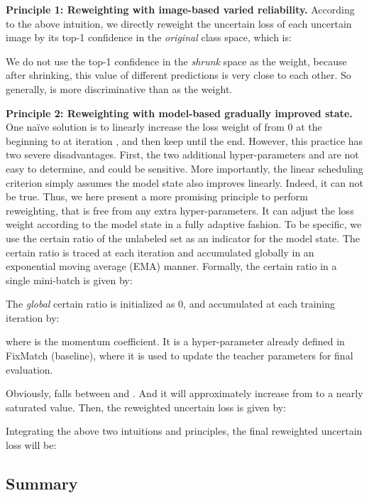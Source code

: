 \documentclass[10pt,twocolumn,letterpaper]{article}
\begin{document}
\vspace{1mm}
\noindent
\textbf{Principle 1: Reweighting with image-based varied reliability.} According to the above intuition, we directly reweight the uncertain loss of each uncertain image by its top-1 confidence  in the \emph{original} class space, which is:
\vspace{-1mm}


We do not use the top-1 confidence  in the \emph{shrunk} space as the weight, because after shrinking, this value of different predictions is very close to each other. So generally,  is more discriminative than  as the weight.

\vspace{1mm}
\noindent
\textbf{Principle 2: Reweighting with model-based gradually improved state.} One na\"ive solution is to linearly increase the loss weight of  from 0 at the beginning to  at iteration , and then keep  until the end. However, this practice has two severe disadvantages. First, the two additional hyper-parameters  and  are not easy to determine, and could be sensitive. More importantly, the linear scheduling criterion simply assumes the model state also improves linearly. Indeed, it can not be true. Thus, we here present a more promising principle to perform reweighting, that is free from any extra hyper-parameters. It can adjust the loss weight according to the model state in a fully adaptive fashion. To be specific, we use the certain ratio of the unlabeled set as an indicator for the model state. The certain ratio is traced at each iteration and accumulated globally in an exponential moving average (EMA) manner. Formally, the certain ratio in a single mini-batch is given by:


The \emph{global} certain ratio  is initialized as 0, and accumulated at each training iteration by:

where  is the momentum coefficient. It is a hyper-parameter already defined in FixMatch (baseline), where it is used to update the teacher parameters for final evaluation.

Obviously,  falls between  and . And it will approximately increase from  to a nearly saturated value. Then, the reweighted uncertain loss is given by:
\vspace{-2mm}


Integrating the above two intuitions and principles, the final reweighted uncertain loss will be:


\subsection{\label{sec:summary}Summary}
\end{document}
